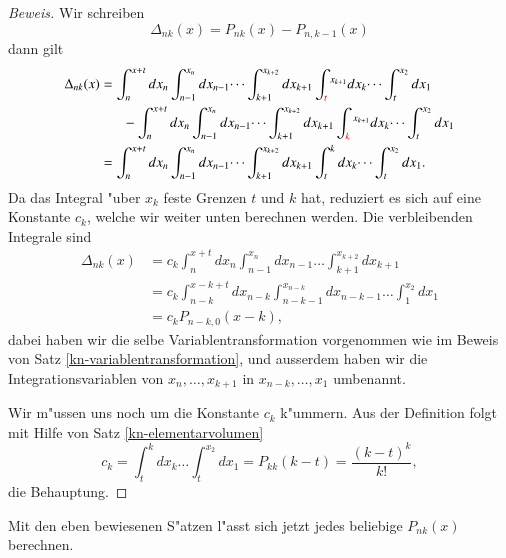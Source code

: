 \begin{proof}[Beweis]
Wir schreiben
\[
\Delta_{nk}(x)= P_{nk}(x)-P_{n,k-1}(x)
\]
dann gilt
\begin{align*}
\Delta_{nk}(x)
&=
\int_n^{x+t}dx_n\int_{n-1}^{x_n}dx_{n-1}\dots\int_{k+1}^{x_{k+2}}dx_{k+1}
\int_{\color{red}t}^{x_{k+1}}dx_k\dots\int_t^{x_2}dx_1
\\
&\phantom{=}\quad-\int_n^{x+t}dx_n\int_{n-1}^{x_n}dx_{n-1}\dots\int_{k+1}^{x_{k+2}}dx_{k+1}
\int_{\color{red}k}^{x_{k+1}}dx_k\dots\int_t^{x_2}dx_1
\\
&=
\int_n^{x+t}dx_n\int_{n-1}^{x_n}dx_{n-1}\dots\int_{k+1}^{x_{k+2}}dx_{k+1}
\int_{t}^{k}dx_k\dots\int_t^{x_2}dx_1.
\end{align*}
Da das Integral "uber $x_k$ feste Grenzen $t$ und $k$ hat, reduziert es
sich auf eine Konstante $c_k$, welche wir weiter unten berechnen werden.
Die verbleibenden Integrale sind
\begin{align*}
\Delta_{nk}(x)
&=
c_k\int_n^{x+t}dx_n\int_{n-1}^{x_n}dx_{n-1}\dots\int_{k+1}^{x_{k+2}}dx_{k+1}
\\
&=
c_k\int_{n-k}^{x-k+t}dx_{n-k}\int_{n-k-1}^{x_{n-k}}dx_{n-k-1}\dots\int_1^{x_2}dx_1
\\
&=c_kP_{n-k,0}(x-k),
\end{align*}
dabei haben wir die selbe Variablentransformation vorgenommen wie im
Beweis von Satz \ref{kn-variablentransformation}, und ausserdem haben
wir die Integrationsvariablen von $x_n,\dots,x_{k+1}$ in $x_{n-k},\dots,x_1$
umbenannt.

Wir m"ussen uns noch um die Konstante $c_k$ k"ummern.
Aus der Definition folgt mit Hilfe von Satz \ref{kn-elementarvolumen}
\begin{equation}
c_k = \int_{t}^{k}dx_k\dots\int_t^{x_2}dx_1=P_{kk}(k-t)=\frac{(k-t)^k}{k!},
\end{equation}
die Behauptung.
\end{proof}
Mit den eben bewiesenen S"atzen l"asst sich jetzt jedes beliebige 
$P_{nk}(x)$ berechnen.

